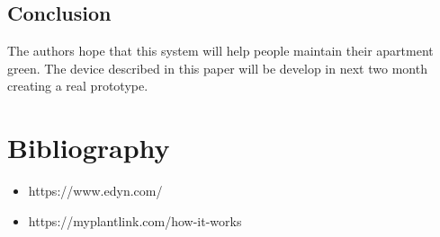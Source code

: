 \documentclass[conference]{IEEEtran}
\begin{document}

\begin{flushleft}
	
\section{Conclusion}
	The authors hope that this system will help people maintain their apartment green.
	The device described in this paper will be develop in  next two month creating a real prototype.
\end{flushleft}

\section{Bibliography}
\begin{itemize}
	\item https://www.edyn.com/
	\item https://myplantlink.com/how-it-works
	
\end{itemize}



\end{document}
